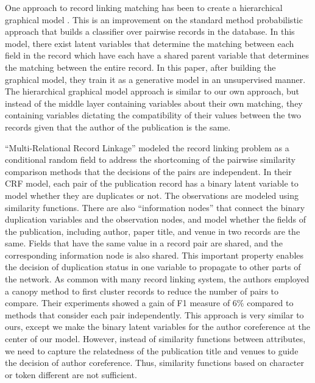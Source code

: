 \documentclass[]{article}
\begin{document}
One approach to record linking matching has been to create a hierarchical graphical model \cite{ravikumar2012hierarchical}. This is an improvement on the standard method probabilistic approach that builds a classifier over pairwise records in the database. In this model, there exist latent variables that determine the matching between each field in the record which have each have a shared parent variable that determines the matching between the entire record. In this paper, after building the graphical model, they train it as a generative model in an unsupervised manner. The hierarchical graphical model approach is similar to our own approach, but instead of the middle layer containing variables about their own matching, they containing variables dictating the compatibility of their values between the two records given that the author of the publication is the same.

``Multi-Relational Record Linkage'' \cite{Domingos04multi} modeled the record linking problem as a conditional random field to address the shortcoming of the pairwise similarity comparison methods that the decisions of the pairs are independent.  In their CRF model, each pair of the publication record has a binary latent variable to model whether they are duplicates or not.  The observations are modeled using similarity functions.  There are also ``information nodes'' that connect the binary duplication variables and the observation nodes, and model whether the fields of the publication, including author, paper title, and venue in two records are the same.  Fields that have the same value in a record pair are shared, and the corresponding information node is also shared.  This important property enables the decision of duplication status in one variable to propagate to other parts of the network.  As common with many record linking system, the authors employed a canopy method to first cluster records to reduce the number of pairs to compare.  Their experiments showed a gain of F1 measure of 6\% compared to methods that consider each pair independently.  This approach is very similar to ours, except we make the binary latent variables for the author coreference at the center of our model.  However, instead of similarity functions between attributes, we need to capture the relatedness of the publication title and venues to guide the decision of author coreference.  Thus, similarity functions based on character or token different are not sufficient.
\end{document}
